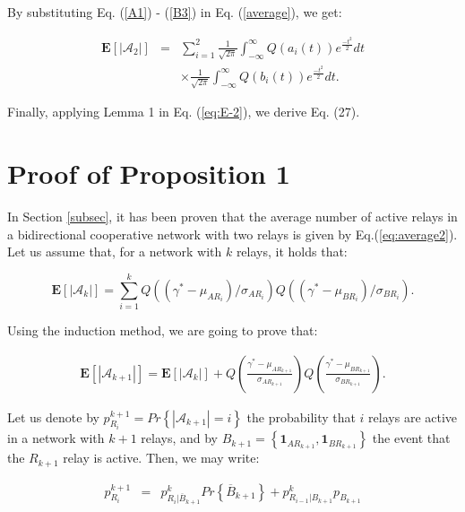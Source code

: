 \documentclass[12pt,draftcls, onecolumn]{IEEEtran}
\begin{document}
By substituting Eq. (\ref{A1}) - (\ref{B3}) in Eq.  (\ref{average}), we get:

\begingroup
\begin{eqnarray}
\label{eq:E-2}
\mathbf{E}\left[\left|\mathcal{A}_2\right|\right] &=& \sum^2_{i=1} \frac{1}{\sqrt{2\pi}}\int^{\infty}_{-\infty} Q\left(a_{i}\left(t\right)\right)e^{\frac{-t^2}{2}}dt\nonumber\\
&& \times\frac{1}{\sqrt{2\pi}}\int^{\infty}_{-\infty} Q\left(b_{i}\left(t\right)\right)e^{\frac{-t^2}{2}}dt.
\end{eqnarray}
\endgroup

Finally, applying Lemma 1 in Eq. (\ref{eq:E-2}), we derive Eq. (27).

\section{Proof of Proposition 1}
\label{a3}

In Section \ref{subsec}, it has been proven that the average number of active relays in a bidirectional cooperative network with two relays is given by Eq.(\ref{eq:average2}). Let us assume that, for a network with $k$ relays, it holds that:

\begin{equation}
\mathbf{E}\left[\left|\mathcal{A}_k\right|\right]=\sum^k_{i=1}Q\left(\left( \gamma^* - \mu_{AR_i}\right)/\sigma_{AR_i}\right)Q\left(\left( \gamma^* - \mu_{BR_i}\right)/\sigma_{BR_i}\right).
\end{equation}

Using the induction method, we are going to prove that:

\begin{eqnarray}
\mathbf{E}\left[\left|\mathcal{A}_{k+1}\right|\right] =  \mathbf{E}\left[\left|\mathcal{A}_{k}\right|\right]+Q\left(\frac{\gamma^* - \mu_{AR_{k+1}}}{\sigma_{AR_{k+1}}}\right)Q\left(\frac{\gamma^* - \mu_{BR_{k+1}}}{\sigma_{BR_{k+1}}}\right).
\end{eqnarray}

Let us denote by $p^{k+1}_{R_i} = Pr\left\{\left|\mathcal{A}_{k+1}\right|=i\right\}$ the probability that $i$ relays are active in a network with $k+1$ relays, and by $B_{k+1} = \left\{\boldsymbol{1}_{AR_{k+1}},\boldsymbol{1}_{BR_{k+1}}\right\}$ the event that the $R_{k+1}$ relay is active. Then, we may write:

\begingroup
\begin{eqnarray}
p^{k+1}_{R_i} &{=}& p^k_{\left.R_i\right|\overline{B}_{k+1}}Pr\left\{\overline{B}_{k+1}\right\}+p^k_{\left.R_{i-1}\right|B_{k+1}}p_{B_{k+1}}
\end{eqnarray}
\endgroup
\end{document}
